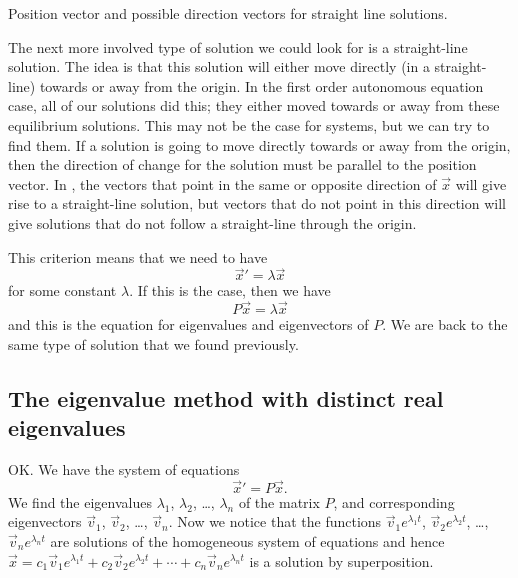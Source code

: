 \begin{mywrapfig}{3.25in}
\capstart
{}
\caption{Position vector and possible direction vectors for straight line solutions.\label{posdir:source-eigfig}}
\end{mywrapfig}

The next more involved type of solution we could look for is a straight-line solution. The idea is that this solution will either move directly (in a straight-line) towards or away from the origin. In the first order autonomous equation case, all of our solutions did this; they either moved towards or away from these equilibrium solutions. This may not be the case for systems, but we can try to find them. If a solution is going to move directly towards or away from the origin, then the direction of change for the solution must be parallel to the position vector. In , the vectors that point in the same or opposite direction of $\vec{x}$ will give rise to a straight-line solution, but vectors that do not point in this direction will give solutions that do not follow a straight-line through the origin. 

This criterion means that we need to have 
\begin{equation*}
\vec{x}' = \lambda \vec{x}
\end{equation*}
for some constant $\lambda$. If this is the case, then we have 
\begin{equation*}
P\vec{x} = \lambda \vec{x}
\end{equation*}
and this is the equation for eigenvalues and eigenvectors of $P$. We are back to the same type of solution that we found previously.

\subsection{The eigenvalue method with distinct real eigenvalues}

OK\@.  We have the system of equations
\begin{equation*}
{\vec{x}}' = P\vec{x} .
\end{equation*}
We find the eigenvalues $\lambda_1$, $\lambda_2$, \ldots, $\lambda_n$
of the matrix $P$, and corresponding eigenvectors
$\vec{v}_1$, $\vec{v}_2$, \ldots, $\vec{v}_n$.
Now we notice that the functions
$\vec{v}_1 e^{\lambda_1 t}$, 
$\vec{v}_2 e^{\lambda_2 t}$, \ldots,
$\vec{v}_n e^{\lambda_n t}$ are solutions of the homogeneous system of equations and hence
$
\vec{x} = c_1 \vec{v}_1 e^{\lambda_1 t} +
c_2 \vec{v}_2 e^{\lambda_2 t} + \cdots +
c_n \vec{v}_n e^{\lambda_n t}
$
is a solution by superposition.

